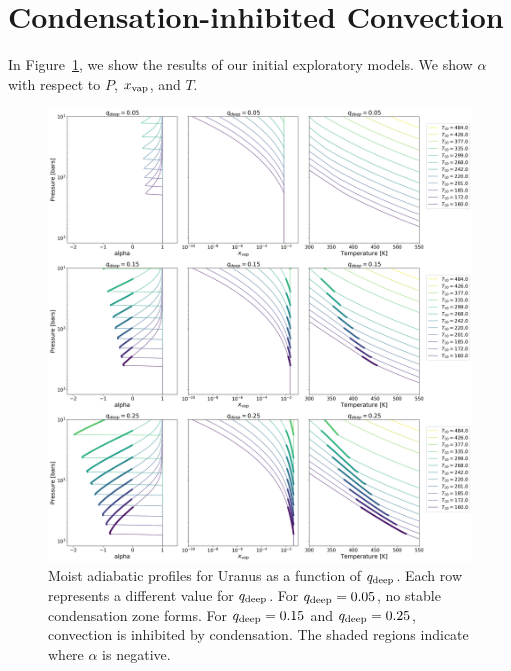 \documentclass[11pt]{ucscthesisbs}
\begin{document}
\section{Condensation-inhibited Convection}
In Figure~\ref{fig:convection_inhibited}, we show the results of our initial exploratory models. We show $\alpha$ with respect to $P$, $x_{\rm vap}$, and $T$. 
\begin{figure}[h]{}
 \centerline{
  \includegraphics[width=\columnwidth]{figures/convection_inhibited_2.png}
 }
\caption[Inhibition of convection on Uranus]
{Moist adiabatic profiles for Uranus as a function of  $q_{\rm deep}$. Each row represents a different value for $q_{\rm deep}$. For $q_{\rm deep} = 0.05$, no stable condensation zone forms. For $q_{\rm deep} = 0.15$ and $q_{\rm deep} = 0.25$, convection is inhibited by condensation. The shaded regions indicate where $\alpha$ is negative.}
\label{fig:convection_inhibited}
\end{figure}
\end{document}
